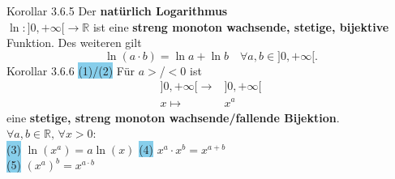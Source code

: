 \documentclass[landscape, 10pt]{article}
\newcommand{\R}{\mathbb{R}}
\begin{document}
\begin{multicols}{3}
              \colorbox{BurntOrange}{Korollar 3.6.5} 
                     Der \textbf{natürlich Logarithmus} \\
                     \textcolor{NavyBlue}{
                     $\ln:]0,+\infty[\longrightarrow\R$} ist eine 
                     \textbf{streng monoton 
                     wachsende, stetige, bijektive} 
                     Funktion. Des weiteren gilt 
                     \begin{equation*}
                            \ln(a\cdot b)=\ln a+\ln b\quad
                            \forall a,b\in]0,+\infty[.
                     \end{equation*}
              \colorbox{BurntOrange}{Korollar 3.6.6} 
                     \colorbox{SkyBlue}{(1)/(2)}
                            Für \textcolor{NavyBlue}{$a>$/$<0$} 
                            ist 
                            \begin{align*}
                                   ]0,+\infty[\longrightarrow
                                   &]0,+\infty[\\
                                   x\longmapsto &x^a
                            \end{align*}
                            eine \textbf{stetige, streng monoton 
                            wachsende/fallende Bijektion}. \\
                            \textcolor{NavyBlue}{
                            $\forall a,b\in\R,\,\forall x>0$}:\\
                     \colorbox{SkyBlue}{(3)} 
                            \textcolor{NavyBlue}{
                            $\ln(x^a)=a\ln(x)$} \qquad
                     \colorbox{SkyBlue}{(4)} 
                            \textcolor{NavyBlue}{
                            $x^a\cdot x^b=x^{a+b}$}\\
                     \colorbox{SkyBlue}{(5)} 
                            \textcolor{NavyBlue}{
                            $(x^a)^b=x^{a\cdot b}$}

\end{multicols}
\end{document}
